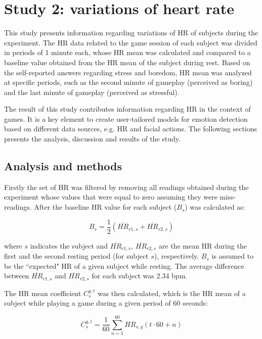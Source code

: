\section{Study 2: variations of heart rate}
\label{sec:experiment1-study2}

This study presents information regarding variations of HR of subjects during the experiment. The HR data related to the game session of each subject was divided in periods of 1 minute each, whose HR mean was calculated and compared to a baseline value obtained from the HR mean of the subject during rest. Based on the self-reported answers regarding stress and boredom, HR mean was analyzed at specific periods, such as the second minute of gameplay (perceived as boring) and the last minute of gameplay (perceived as stressful).

The result of this study contributes information regarding HR in the context of games. It is a key element to create user-tailored models for emotion detection based on different data sources, e.g. HR and facial actions. The following sections presents the analysis, discussion and results of the study.

\subsection{Analysis and methods}
\label{sec:study2-methodology}

Firstly the set of HR was filtered by removing all readings obtained during the experiment whose values that were equal to zero assuming they were miss-readings. After the baseline HR value for each subject ($B_s$) was calculated as:

\begin{equation} \label{eq:baseline}
B_s = \frac{1}{2}(\overline{HR}_{r1,s} + \overline{HR}_{r2,s})
\end{equation}

where $s$ indicates the subject and $\overline{HR}_{r1,s}$, $\overline{HR}_{r2,s}$ are the mean HR during the first and the second resting period (for subject $s$), respectively. $B_s$ is assumed to be the ``expected" HR of a given subject while resting. The average difference between $\overline{HR}_{r1,s}$ and $\overline{HR}_{r2,s}$ for each subject was 2.34 bpm.

The HR mean coefficient $C_s^{g,t}$ was then calculated, which is the HR mean of a subject while playing a game during a given period of 60 seconds:

\begin{equation} \label{eq:variation}
C_s^{g,t} = \frac{1}{60}\sum_{n=1}^{60} HR_{s,g}(t\cdot 60 + n)
\end{equation}

